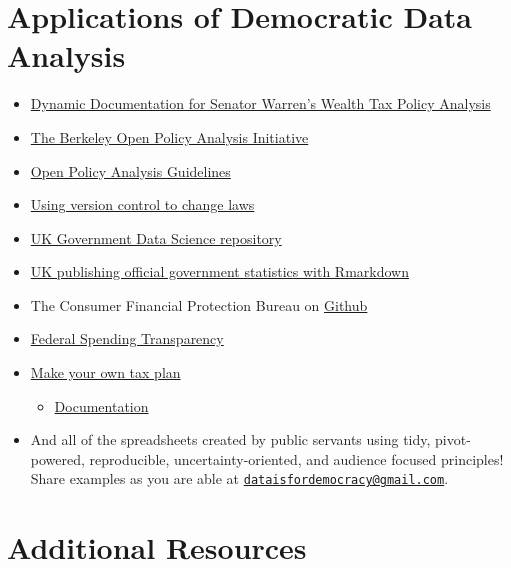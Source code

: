 \documentclass[
]{book}
\providecommand{\tightlist}{%
  \setlength{\itemsep}{0pt}\setlength{\parskip}{0pt}}
\begin{document}
\hypertarget{applications-of-democratic-data-analysis}{%
\section{Applications of Democratic Data Analysis}\label{applications-of-democratic-data-analysis}}

\begin{itemize}
\tightlist
\item
  \href{http://wealthtaxsimulator.org/analysis/}{Dynamic Documentation for Senator Warren's Wealth Tax Policy Analysis}
\item
  \href{https://www.bitss.org/opa/}{The Berkeley Open Policy Analysis Initiative}
\item
  \href{https://www.bitss.org/wp-content/uploads/2019/03/OPA-Guidelines.pdf}{Open Policy Analysis Guidelines}
\item
  \href{https://arstechnica.com/tech-policy/2018/11/how-i-changed-the-law-with-a-github-pull-request/}{Using version control to change laws}
\item
  \href{https://github.com/ukgovdatascience}{UK Government Data Science repository}
\item
  \href{https://blog.revolutionanalytics.com/2017/03/uk-statistics.html}{UK publishing official government statistics with Rmarkdown}
\item
  The Consumer Financial Protection Bureau on \href{https://github.com/cfpb}{Github}
\item
  \href{https://fedspendingtransparency.github.io}{Federal Spending Transparency}
\item
  \href{https://taxjusticenow.org/\#/}{Make your own tax plan}

  \begin{itemize}
  \tightlist
  \item
    \href{https://eml.berkeley.edu/~saez/taxsimulator.pdf}{Documentation}
  \end{itemize}
\item
  And all of the spreadsheets created by public servants using tidy, pivot-powered, reproducible, uncertainty-oriented, and audience focused principles! Share examples as you are able at \href{mailto:dataisfordemocracy@gmail.com}{\nolinkurl{dataisfordemocracy@gmail.com}}.
\end{itemize}

\hypertarget{additional-resources}{%
\section{Additional Resources}\label{additional-resources}}
\end{document}
